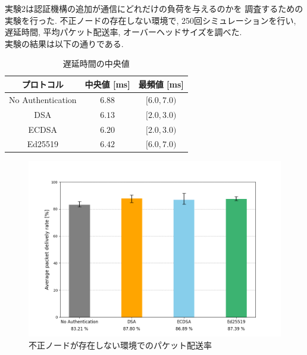 実験2は認証機構の追加が通信にどれだけの負荷を与えるのかを
調査するための実験を行った. 
不正ノードの存在しない環境で, 250回シミュレーションを行い, 
遅延時間, 平均パケット配送率, オーバーヘッドサイズを調べた. \\
\indent 実験の結果は以下の通りである. \\

\begin{longtable}{ccc}
  \caption{遅延時間の中央値}
  \label{tab:exp2_delay} \\
  \endfirsthead
  \hline
  \multicolumn{1}{c}{プロトコル} &
  \multicolumn{1}{c}{中央値 [ms]} &
  \multicolumn{1}{c}{最頻値 [ms]} \\ \hline \hline
  No Authentication & $6.88$ & $[6.0, 7.0)$ \\
  DSA & $6.13$ & $[2.0, 3.0)$ \\
  ECDSA & $6.20$ & $[2.0, 3.0)$ \\
  Ed25519 & $6.42$ & $[6.0, 7.0)$ \\ \hline
\end{longtable}

\begin{figure}
  \centering
  \includegraphics[width=1\textwidth]{figures/exp2_pdr.png}
  \caption{不正ノードが存在しない環境でのパケット配送率}
  \label{fig:exp2_pdr}
\end{figure}

